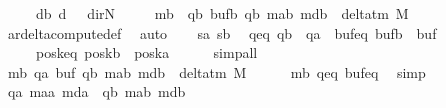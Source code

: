 \begin{isabellebody}
\ \ \ \ \ d{}b{\isacharcolon}{\kern0pt}\ {\isachardoublequoteopen}d{}\ {\isacharequal}{\kern0pt}\ {\isacharparenleft}{\kern0pt}{\isasymlambda}{\isacharunderscore}{\kern0pt}{\isachardot}{\kern0pt}\ dir{\isachardot}{\kern0pt}N{\isacharparenright}{\kern0pt}{\isachardoublequoteclose}\isanewline
\ \ \ \ \ mb{\isacharcolon}{\kern0pt}\ \ {\isachardoublequoteopen}{\isacharparenleft}{\kern0pt}qb{\isacharcomma}{\kern0pt}\ bufb{\isacharcomma}{\kern0pt}\ qb{\isacharprime}{\kern0pt}{\isacharcomma}{\kern0pt}\ m{\isacharunderscore}{\kern0pt}ab{\isacharprime}{\kern0pt}{\isacharcomma}{\kern0pt}\ m{\isacharunderscore}{\kern0pt}db{\isacharparenright}{\kern0pt}\ {\isasymin}\ delta{\isacharunderscore}{\kern0pt}tm\ M{\isachardoublequoteclose}\isanewline
\ \ \ \ \isamarkupfalse%
\ ar{\isacharunderscore}{\kern0pt}delta{\isacharunderscore}{\kern0pt}compute{\isacharunderscore}{\kern0pt}def\ \isamarkupfalse%
\ auto\isanewline
\ \ \isamarkupfalse%
\ sa\ sb\ \isamarkupfalse%
\ qeq{\isacharcolon}{\kern0pt}\ {\isachardoublequoteopen}qb\ {\isacharequal}{\kern0pt}\ qa{\isachardoublequoteclose}\ \ bufeq{\isacharcolon}{\kern0pt}\ {\isachardoublequoteopen}bufb\ {\isacharequal}{\kern0pt}\ buf{\isachardoublequoteclose}\isanewline
\ \ \ \ \ poskeq{\isacharcolon}{\kern0pt}\ {\isachardoublequoteopen}poskb\ {\isacharequal}{\kern0pt}\ poska{\isachardoublequoteclose}\isanewline
\ \ \ \ \isamarkupfalse%
\ simp{\isacharunderscore}{\kern0pt}all\isanewline
\ \ \isamarkupfalse%
\ mb{\isacharprime}{\kern0pt}{\isacharcolon}{\kern0pt}\ {\isachardoublequoteopen}{\isacharparenleft}{\kern0pt}qa{\isacharcomma}{\kern0pt}\ buf{\isacharcomma}{\kern0pt}\ qb{\isacharprime}{\kern0pt}{\isacharcomma}{\kern0pt}\ m{\isacharunderscore}{\kern0pt}ab{\isacharprime}{\kern0pt}{\isacharcomma}{\kern0pt}\ m{\isacharunderscore}{\kern0pt}db{\isacharparenright}{\kern0pt}\ {\isasymin}\ delta{\isacharunderscore}{\kern0pt}tm\ M{\isachardoublequoteclose}\isanewline
\ \ \ \ \isamarkupfalse%
\ mb\ qeq\ bufeq\ \isamarkupfalse%
\ simp\isanewline
\ \ \isamarkupfalse%
\ {\isachardoublequoteopen}{\isacharparenleft}{\kern0pt}qa{\isacharprime}{\kern0pt}{\isacharcomma}{\kern0pt}\ m{\isacharunderscore}{\kern0pt}aa{\isacharprime}{\kern0pt}{\isacharcomma}{\kern0pt}\ m{\isacharunderscore}{\kern0pt}da{\isacharparenright}{\kern0pt}\ {\isacharequal}{\kern0pt}\ {\isacharparenleft}{\kern0pt}qb{\isacharprime}{\kern0pt}{\isacharcomma}{\kern0pt}\ m{\isacharunderscore}{\kern0pt}ab{\isacharprime}{\kern0pt}{\isacharcomma}{\kern0pt}\ m{\isacharunderscore}{\kern0pt}db{\isacharparenright}{\kern0pt}{\isachardoublequoteclose}\isanewline

\end{isabellebody}
